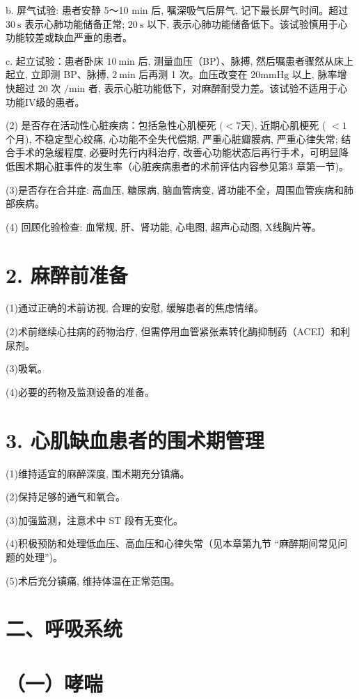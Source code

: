 \documentclass[10pt]{article}
\begin{document}
b. 屏气试验: 患者安静 5～10 min 后, 嘱深吸气后屏气, 记下最长屏气时间。超过 $30 \mathrm{~s}$ 表示心肺功能储备正常; $20 \mathrm{~s}$ 以下, 表示心肺功能储备低下。该试验慎用于心功能较差或缺血严重的患者。

c. 起立试验：患者卧床 $10 \mathrm{~min}$ 后, 测量血压（BP）、脉搏, 然后嘱患者骤然从床上起立, 立即测 BP、脉搏, $2 \mathrm{~min}$ 后再测 1 次。血压改变在 $20 \mathrm{mmHg}$ 以上, 脉率增快超过 20 次 $/ \mathrm{min}$ 者, 表示心脏功能低下，对麻醉耐受力差。该试验不适用于心功能IV级的患者。

(2) 是否存在活动性心脏疾病：包括急性心肌梗死 $(<7$天), 近期心肌梗死 ( $<1$ 个月), 不稳定型心绞痛, 心功能不全失代偿期, 严重心脏瓣膜病, 严重心律失常; 结合手术的急缓程度, 必要时先行内科治疗, 改善心功能状态后再行手术，可明显降低围术期心脏事件的发生率（心脏疾病患者的术前评估内容参见第3 章第一节)。

(3)是否存在合并症: 高血压, 糖尿病, 脑血管病变, 肾功能不全，周围血管疾病和肺部疾病。

(4) 回顾化验检查: 血常规, 肝、肾功能, 心电图, 超声心动图, X线胸片等。

\section*{2. 麻醉前准备}
(1)通过正确的术前访视, 合理的安慰, 缓解患者的焦虑情绪。

(2)术前继续心拄病的药物治疗, 但需停用血管紧张素转化酶抑制药（ACEI）和利尿剂。

(3)吸氧。

(4)必要的药物及监测设备的准备。

\section*{3. 心肌缺血患者的围术期管理}
(1)维持适宜的麻醉深度, 围术期充分镇痛。

(2)保持足够的通气和氧合。

(3)加强监测，注意术中 ST 段有无变化。

(4)积极预防和处理低血压、高血压和心律失常（见本章第九节 “麻醉期间常见问题的处理”)。

(5)术后充分镇痛, 维持体温在正常范围。

\section*{二、呼吸系统}
\section*{（一）哮喘}
\end{document}
